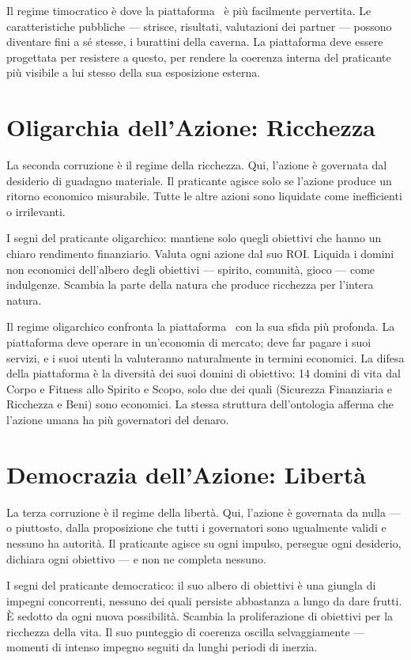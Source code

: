 Il regime timocratico \`e dove la piattaforma \praxis\ \`e pi\`u
facilmente pervertita. Le caratteristiche pubbliche --- strisce,
risultati, valutazioni dei partner --- possono diventare fini a s\'e
stesse, i burattini della caverna. La piattaforma deve essere progettata
per resistere a questo, per rendere la coerenza interna del praticante
pi\`u visibile a lui stesso della sua esposizione esterna.

\section{Oligarchia dell'Azione: Ricchezza}

La seconda corruzione \`e il regime della ricchezza. Qui, l'azione \`e
governata dal desiderio di guadagno materiale. Il praticante agisce solo
se l'azione produce un ritorno economico misurabile. Tutte le altre
azioni sono liquidate come inefficienti o irrilevanti.

I segni del praticante oligarchico: mantiene solo quegli obiettivi che
hanno un chiaro rendimento finanziario. Valuta ogni azione dal suo ROI.
Liquida i domini non economici dell'albero degli obiettivi --- spirito,
comunit\`a, gioco --- come indulgenze. Scambia la parte della natura
che produce ricchezza per l'intera natura.

Il regime oligarchico confronta la piattaforma \praxis\ con la sua sfida
pi\`u profonda. La piattaforma deve operare in un'economia di mercato;
deve far pagare i suoi servizi, e i suoi utenti la valuteranno
naturalmente in termini economici. La difesa della piattaforma \`e la
diversit\`a dei suoi domini di obiettivo: 14 domini di vita dal Corpo
e Fitness allo Spirito e Scopo, solo due dei quali (Sicurezza Finanziaria
e Ricchezza e Beni) sono economici. La stessa struttura dell'ontologia
afferma che l'azione umana ha pi\`u governatori del denaro.

\section{Democrazia dell'Azione: Libert\`a}

La terza corruzione \`e il regime della libert\`a. Qui, l'azione \`e
governata da nulla --- o piuttosto, dalla proposizione che tutti i
governatori sono ugualmente validi e nessuno ha autorit\`a. Il praticante
agisce su ogni impulso, persegue ogni desiderio, dichiara ogni obiettivo
--- e non ne completa nessuno.

I segni del praticante democratico: il suo albero di obiettivi \`e una
giungla di impegni concorrenti, nessuno dei quali persiste abbastanza a
lungo da dare frutti. \`E sedotto da ogni nuova possibilit\`a. Scambia
la proliferazione di obiettivi per la ricchezza della vita. Il suo
punteggio di coerenza oscilla selvaggiamente --- momenti di intenso
impegno seguiti da lunghi periodi di inerzia.

